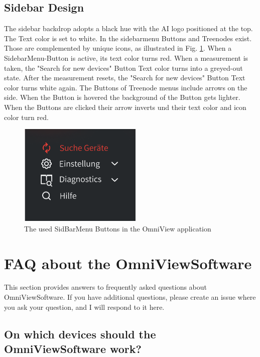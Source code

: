 \documentclass[]{scrreprt}
\begin{document}
\begin{itemize}
\subsection{Sidebar Design}


The sidebar backdrop adopts a black hue with the AI logo positioned at the top. The Text color is set to white.
In the sidebarmenu Buttons and Treenodes exist. Those are complemented by unique icons, as illustrated in Fig. \ref{fig: SideMenuIcons}.
 When a SidebarMenu-Button is active, its text color turns red. When a measurement is taken, the "Search for new devices" Button Text color turns into a greyed-out state.
  After the measurement resets, the "Search for new devices" Button Text color turns white again. The Buttons of Treenode menus include arrows on the side.
   When the Button is hovered the background of the Button gets lighter.
 When the Buttons are clicked their arrow inverts und their text color and icon color turn red.


\begin{figure}
    \includegraphics[width=.4\textwidth]{assets/pictures/SideBarMenuButtons.png}
    \caption[]{The used SidBarMenu Buttons in the OmniView application}
    \label{fig: SideMenuIcons}
\end{figure}




    \section{FAQ about the OmniViewSoftware}


    This section provides answers to frequently asked questions about OmniViewSoftware. If you have additional questions, please create an issue where you ask your question, and I will respond to it here.


    \subsection{On which devices should the OmniViewSoftware work?}



\end{itemize}
\end{document}
